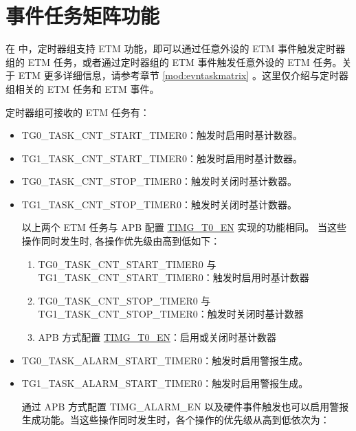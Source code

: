 \documentclass[main\_\_CN.tex]{subfiles}
\begin{document}

\section{事件任务矩阵功能}
\label{sec:timg-etm-func}

在 \chipname{} 中，定时器组支持 ETM 功能，即可以通过任意外设的 ETM 事件触发定时器组的 ETM 任务，或者通过定时器组的 ETM 事件触发任意外设的 ETM 任务。关于 ETM 更多详细信息，请参考章节 \ref{mod:evntaskmatrix} 。这里仅介绍与定时器组相关的 ETM 任务和 ETM 事件。

定时器组可接收的 ETM 任务有：

\begin{itemize}
\item TG0\_TASK\_CNT\_START\_TIMER0：触发时启用时基计数器。
\item TG1\_TASK\_CNT\_START\_TIMER0：触发时启用时基计数器。
\item TG0\_TASK\_CNT\_STOP\_TIMER0：触发时关闭时基计数器。
\item TG1\_TASK\_CNT\_STOP\_TIMER0：触发时关闭时基计数器。

\begin{tiplisting}
以上两个 ETM 任务与 APB 配置 \hyperref[fielddesc:TIMGTXEN]{TIMG\_T0\_EN} 实现的功能相同。 当这些操作同时发生时, 各操作优先级由高到低如下：

\begin{enumerate}
    \item TG0\_TASK\_CNT\_START\_TIMER0 与 TG1\_TASK\_CNT\_START\_TIMER0：触发时启用时基计数器
    \item TG0\_TASK\_CNT\_STOP\_TIMER0 与 TG1\_TASK\_CNT\_STOP\_TIMER0：触发时关闭时基计数器
    \item APB 方式配置 \hyperref[fielddesc:TIMGTXEN]{TIMG\_T0\_EN}：启用或关闭时基计数器
\end{enumerate}
\end{tiplisting}

\item TG0\_TASK\_ALARM\_START\_TIMER0：触发时启用警报生成。
\item TG1\_TASK\_ALARM\_START\_TIMER0：触发时启用警报生成。

\begin{tiplisting}
通过 APB 方式配置 TIMG\_ALARM\_EN 以及硬件事件触发也可以启用警报生成功能。当这些操作同时发生时，各个操作的优先级从高到低依次为：


\end{tiplisting}
\end{itemize}
\end{document}
